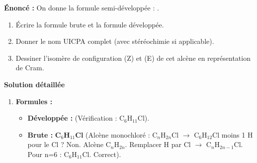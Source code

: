 \documentclass[11pt]{article}
\begin{document}
\begin{exoresolu}
\textbf{Énoncé :} On donne la formule semi-développée : .
\begin{enumerate}
    \item Écrire la formule brute et la formule développée.
    \item Donner le nom UICPA complet (avec stéréochimie si applicable).
    \item Dessiner l'isomère de configuration (Z) et (E) de cet alcène en représentation de Cram.
\end{enumerate}

\tcblower
\textbf{Solution détaillée}

\begin{enumerate}
    \item \textbf{Formules :}
    \begin{itemize}
        \item \textbf{Développée :}  (Vérification : C$_6$H$_{11}$Cl).
        \item \textbf{Brute :} \textbf{C$_6$H$_{11}$Cl} (Alcène monochloré : C$_n$H$_{2n}$Cl $\rightarrow$ C$_6$H$_{12}$Cl moins 1 H pour le Cl ? Non. Alcène C$_n$H$_{2n}$. Remplacer H par Cl $\rightarrow$ C$_n$H$_{2n-1}$Cl. Pour n=6 : C$_6$H$_{11}$Cl. Correct).
    \end{itemize}


\end{enumerate}
\end{exoresolu}
\end{document}
